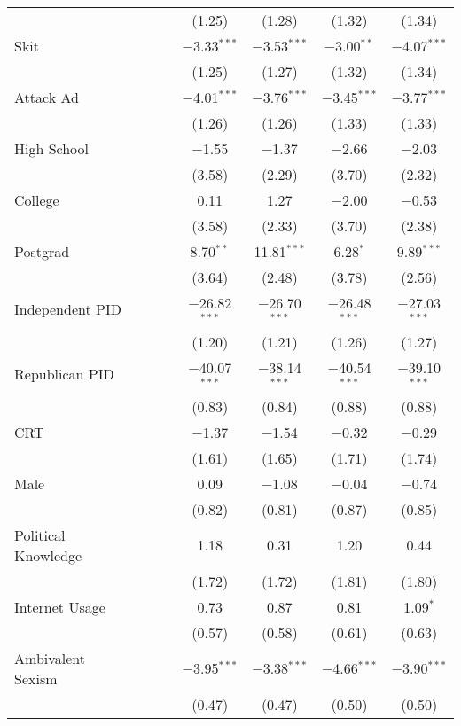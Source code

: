 \begin{table}[!htbp]
\begin{tabular}{@{\extracolsep{-2pt}}lccccccc}
  &  &  &  & (1.25) & (1.28) & (1.32) & (1.34) \\ 
  Skit &  &  &  & $-$3.33$^{***}$ & $-$3.53$^{***}$ & $-$3.00$^{**}$ & $-$4.07$^{***}$ \\ 
  &  &  &  & (1.25) & (1.27) & (1.32) & (1.34) \\ 
  Attack Ad &  &  &  & $-$4.01$^{***}$ & $-$3.76$^{***}$ & $-$3.45$^{***}$ & $-$3.77$^{***}$ \\ 
  &  &  &  & (1.26) & (1.26) & (1.33) & (1.33) \\ 
  High School &  &  &  & $-$1.55 & $-$1.37 & $-$2.66 & $-$2.03 \\ 
  &  &  &  & (3.58) & (2.29) & (3.70) & (2.32) \\ 
  College &  &  &  & 0.11 & 1.27 & $-$2.00 & $-$0.53 \\ 
  &  &  &  & (3.58) & (2.33) & (3.70) & (2.38) \\ 
  Postgrad &  &  &  & 8.70$^{**}$ & 11.81$^{***}$ & 6.28$^{*}$ & 9.89$^{***}$ \\ 
  &  &  &  & (3.64) & (2.48) & (3.78) & (2.56) \\ 
  Independent PID &  &  &  & $-$26.82$^{***}$ & $-$26.70$^{***}$ & $-$26.48$^{***}$ & $-$27.03$^{***}$ \\ 
  &  &  &  & (1.20) & (1.21) & (1.26) & (1.27) \\ 
  Republican PID &  &  &  & $-$40.07$^{***}$ & $-$38.14$^{***}$ & $-$40.54$^{***}$ & $-$39.10$^{***}$ \\ 
  &  &  &  & (0.83) & (0.84) & (0.88) & (0.88) \\ 
  CRT &  &  &  & $-$1.37 & $-$1.54 & $-$0.32 & $-$0.29 \\ 
  &  &  &  & (1.61) & (1.65) & (1.71) & (1.74) \\ 
  Male &  &  &  & 0.09 & $-$1.08 & $-$0.04 & $-$0.74 \\ 
  &  &  &  & (0.82) & (0.81) & (0.87) & (0.85) \\ 
  Political Knowledge &  &  &  & 1.18 & 0.31 & 1.20 & 0.44 \\ 
  &  &  &  & (1.72) & (1.72) & (1.81) & (1.80) \\ 
  Internet Usage &  &  &  & 0.73 & 0.87 & 0.81 & 1.09$^{*}$ \\ 
  &  &  &  & (0.57) & (0.58) & (0.61) & (0.63) \\ 
  Ambivalent Sexism &  &  &  & $-$3.95$^{***}$ & $-$3.38$^{***}$ & $-$4.66$^{***}$ & $-$3.90$^{***}$ \\ 
  &  &  &  & (0.47) & (0.47) & (0.50) & (0.50) \\ 

\end{tabular}
\end{table}

